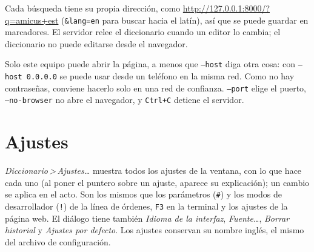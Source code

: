 \documentclass[12pt,
              article,
              oneside
              ]{memoir}
\newcommand*{\menu}[1]{\textit{#1}}
\newcommand*{\then}{\,>\,}
\newcommand*{\key}[1]{\texttt{#1}}
\begin{document}
%
Cada búsqueda tiene su propia dirección, como
\url{http://127.0.0.1:8000/?q=amicus+est} (\texttt{\&lang=en} para buscar
hacia el latín), así que se puede guardar en marcadores. El servidor
relee el diccionario cuando un editor lo cambia; el diccionario no puede
editarse desde el navegador.

%
Solo este equipo puede abrir la página, a menos que \texttt{--host} diga
otra cosa: con \texttt{--host 0.0.0.0} se puede usar desde un teléfono en
la misma red. Como no hay contraseñas, conviene hacerlo solo en una red de
confianza. \texttt{--port} elige el puerto, \texttt{--no-browser} no abre
el navegador, y \key{Ctrl+C} detiene el servidor.

\section{Ajustes}
\label{sec:settings}

%
\menu{Diccionario\then Ajustes\ldots} muestra todos los ajustes de la
ventana, con lo que hace cada uno (al poner el puntero sobre un ajuste,
aparece su explicación); un cambio se aplica en el acto. Son los mismos
que los parámetros (\texttt{\#}) y los modos de desarrollador
(\texttt{!}) de la línea de órdenes, \key{F3} en la terminal y los ajustes
de la página web. El diálogo tiene también \menu{Idioma de la interfaz},
\menu{Fuente\ldots}, \menu{Borrar historial} y \menu{Ajustes por defecto}.
Los ajustes conservan su nombre inglés, el mismo del archivo de
configuración.
\end{document}
